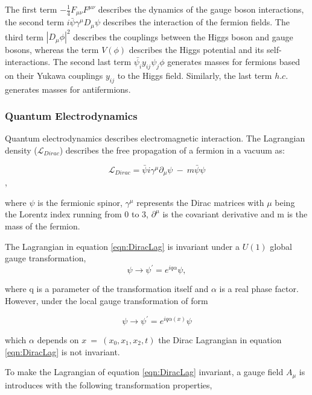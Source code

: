 The first term $-\frac{1}{4}F_{\mu\nu}F^{\mu\nu}$ describes the dynamics of the gauge boson interactions, the second term $i\bar{\psi}\gamma^{\mu}D_{\mu}\psi$ describes the interaction of the fermion fields. The third term $|D_{\mu}\phi|^{2}$ describes the couplings between the Higgs boson and gauge bosons, whereas the term $V(\phi)$ describes the Higgs potential and its self-interactions. The second last term $\bar{\psi_{i}}y_{ij}\psi_{j}\phi$ generates masses for fermions based on their Yukawa couplings $y_{ij}$ to the Higgs field. Similarly, the last term $h.c.$ generates masses for antifermions. 

\subsubsection{Quantum Electrodynamics}
\label{subsubsec:QED}
Quantum electrodynamics describes electromagnetic interaction. The Lagrangian density ($\mathcal{L}_{Dirac}$) describes the free propagation of a fermion in a vacuum as:  

\begin{equation}
\mathcal{L}_{Dirac} = \bar{\psi} i \gamma^{\mu} \partial_{\mu} \psi ~-~ m\bar{\psi}\psi
\label{eqn:DiracLag}
\end{equation},

where $\psi$ is the fermionic spinor, $\gamma^{\mu}$ represents the Dirac matrices with $\mu$ being the Lorentz index running from $0$ to $3$, $\partial^{\mu}$ is the covariant derivative and m is the mass of the fermion. 

The Lagrangian in equation \ref{eqn:DiracLag} is invariant under a $U(1)$ global gauge transformation, 
\begin{equation}
\psi\rightarrow \psi^{'}=e^{iq\alpha}\psi, 
\label{eqn:QEDGlobalTrans}
\end{equation}

where q is a parameter of the transformation itself and $\alpha$ is a real phase factor. However, under the local gauge transformation of form 

\begin{equation}
\psi\rightarrow \psi^{'}=e^{iq\alpha(x)}\psi
\label{eqn:QEDLocalTrans}
\end{equation}

which $\alpha$ depends on $x~=~(x_{0},x_{1},x_{2},t)$ the Dirac Lagrangian in equation \ref{eqn:DiracLag} is not invariant. 

To make the Lagrangian of equation \ref{eqn:DiracLag} invariant, a gauge field $A_{\mu}$ is introduces with the following transformation properties, 


